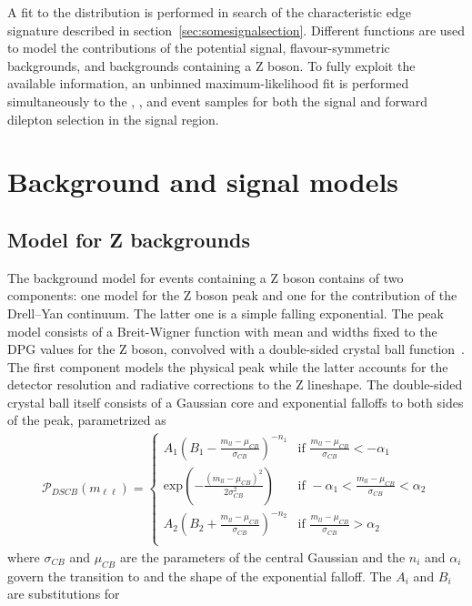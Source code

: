 A fit to the \mll distribution is performed in search of the characteristic edge signature described in section~\ref{sec:somesignalsection}. Different functions are used to model the contributions of the potential signal, flavour-symmetric backgrounds, and backgrounds containing a Z boson. To fully exploit the available information, an unbinned maximum-likelihood fit is performed simultaneously to the \EE, \MM, and \EM event samples for both the signal and forward dilepton selection in the signal region.

\section{Background and signal models}



\subsection{Model for Z backgrounds}
\label{sec:Zmodel}
The background model for events containing a Z boson contains of two components: one model for the Z boson peak and one for the contribution of the Drell--Yan continuum. The latter one is a simple falling exponential. The peak model consists of a Breit-Wigner function with mean and widths fixed to the DPG values for the Z boson, convolved with a double-sided crystal ball function~\cite{Crystal}. The first component models the physical peak while the latter accounts for the detector resolution and radiative corrections to the Z lineshape. The double-sided crystal ball itself consists of a Gaussian core and exponential falloffs to both sides of the peak, parametrized as
\begin{eqnarray*}
\mathcal{P}_{DSCB}(m_{\ell\ell}) = \begin{cases} A_{1} (B_{1}-\frac{m_{ll}-\mu_{CB}}{\sigma_{CB}})^{-n_{1}} &\mbox{if } \frac{m_{ll}-\mu_{CB}}{\sigma_{CB}}<-\alpha_{1} \\
\textrm{exp}\left(-\frac{(m_{ll}-\mu_{CB})^2}{2\sigma_{CB}^2}\right) &\mbox{if } -\alpha_{1}<\frac{m_{ll}-\mu_{CB}}{\sigma_{CB}}<\alpha_{2} \\
A_{2} (B_{2}+\frac{m_{ll}-\mu_{CB}}{\sigma_{CB}})^{-n_{2}} &\mbox{if } \frac{m_{ll}-\mu_{CB}}{\sigma_{CB}}>\alpha_{2} \\
\end{cases}
\end{eqnarray*}
where $\sigma_{CB}$ and $\mu_{CB}$ are the parameters of the central Gaussian and the $n_i$ and $\alpha_i$ govern the transition to and the shape of the exponential falloff. The $A_i$ and $B_i$ are substitutions for
